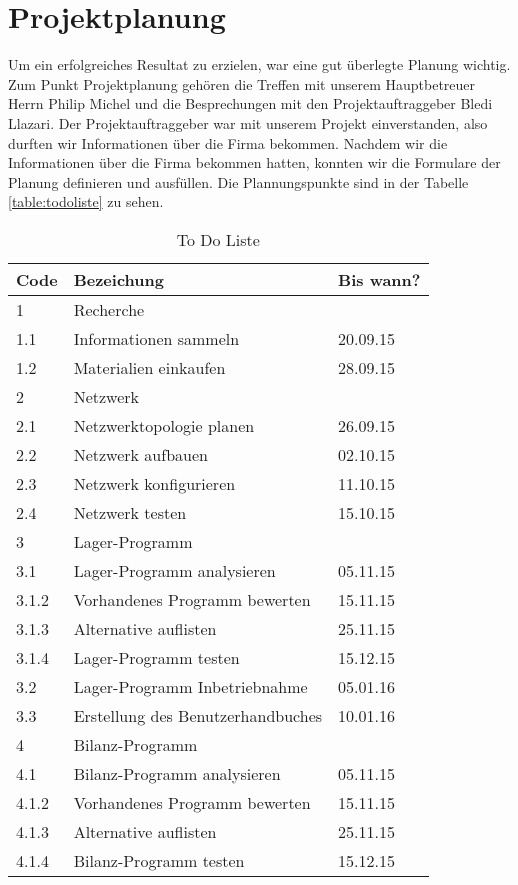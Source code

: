 \section{Projektplanung}
Um ein erfolgreiches Resultat zu erzielen, war eine gut \"uberlegte Planung wichtig. Zum Punkt Projektplanung geh\"oren die Treffen mit unserem Hauptbetreuer Herrn Philip Michel und die Besprechungen mit den Projektauftraggeber Bledi Llazari. Der Projektauftraggeber war mit unserem Projekt einverstanden, also durften wir Informationen \"uber die Firma bekommen. Nachdem wir die Informationen \"uber die Firma bekommen hatten, konnten wir die Formulare der Planung definieren und ausf\"ullen. Die Plannungspunkte sind in der Tabelle \ref{table:todoliste} zu sehen. 
\begin{table}[ht]
\caption{To Do Liste}
\centering
\begin{tabular}{l l l}
\hline\hline
Code & Bezeichung & Bis wann?  \\ [0.5ex]
\hline
1 & Recherche \\
1.1 & Informationen sammeln & 20.09.15 \\
1.2 & Materialien einkaufen & 28.09.15 \\
2 & Netzwerk \\
2.1 & Netzwerktopologie planen & 26.09.15 \\
2.2 & Netzwerk aufbauen & 02.10.15 \\
2.3 & Netzwerk konfigurieren & 11.10.15 \\
2.4 & Netzwerk testen & 15.10.15 \\
3 & Lager-Programm \\
3.1 & Lager-Programm analysieren & 05.11.15 \\
3.1.2 & Vorhandenes Programm bewerten & 15.11.15 \\
3.1.3 & Alternative auflisten & 25.11.15 \\
3.1.4 & Lager-Programm testen & 15.12.15 \\
3.2 & Lager-Programm Inbetriebnahme & 05.01.16 \\
3.3 & Erstellung des Benutzerhandbuches & 10.01.16 \\
4 & Bilanz-Programm \\
4.1 & Bilanz-Programm analysieren & 05.11.15 \\
4.1.2 & Vorhandenes Programm bewerten & 15.11.15 \\
4.1.3 & Alternative auflisten & 25.11.15 \\
4.1.4 & Bilanz-Programm testen & 15.12.15 \\

\end{tabular}
\end{table}
